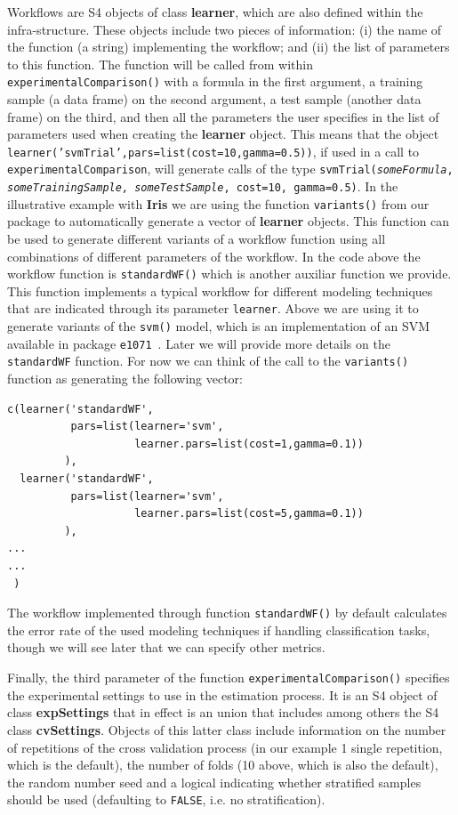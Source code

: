 \documentclass[10pt,a4paper]{article}
\begin{document}
Workflows are S4 objects of class \textbf{learner}, which are also
defined within the infra-structure. These objects include two pieces
of information: (i) the name of the function (a string) implementing the
workflow; and (ii) the list of parameters to this function. The
function will be called from within 
\texttt{experimentalComparison()}  with a formula in the first
argument, a training sample (a data frame) on the second argument, a
test sample (another data frame) on the third, and then all the parameters
the user specifies in the list of parameters used when creating the
\textbf{learner} object. This means that the object
\texttt{learner('svmTrial',pars=list(cost=10,gamma=0.5))}, if used in a
call to \texttt{experimentalComparison}, will 
 generate calls of the type
\texttt{svmTrial(\textit{someFormula}, \textit{someTrainingSample}, \textit{someTestSample}, cost=10,
  gamma=0.5)}. In the illustrative example with \textbf{Iris} we are using the function \texttt{variants()} from our package to automatically
generate a vector of \textbf{learner} objects. This function can be used
to generate different variants of a workflow function using all
combinations of different parameters of the workflow. In the code
above the workflow function is \texttt{standardWF()} which is another
auxiliar function we provide. This function implements a typical
workflow for different modeling techniques that are indicated through
its parameter \texttt{learner}. Above we are using it to generate
variants of the \texttt{svm()} model, which is an implementation of an SVM available in package \texttt{e1071}~\cite{}.  Later we will provide
more details on the \texttt{standardWF} function. For now we can think of the call
to the \texttt{variants()} function as generating the following vector:\linebreak
\begin{verbatim}
c(learner('standardWF',
          pars=list(learner='svm',
                    learner.pars=list(cost=1,gamma=0.1))
         ), 
  learner('standardWF',
          pars=list(learner='svm',
                    learner.pars=list(cost=5,gamma=0.1))
         ),
...
...
 ) 
\end{verbatim}
 
The workflow implemented through function \texttt{standardWF()} by
default calculates the error rate of the used modeling techniques if
handling classification tasks, though we will see later that we can
specify other metrics.

Finally, the third parameter of the function
\texttt{experimentalComparison()} specifies the experimental settings
to use in the estimation process. It is an S4 object of class
\textbf{expSettings} that in effect is an union that includes among
others the S4 class \textbf{cvSettings}. Objects of this latter class
include information on the number of repetitions of the cross
validation process (in our example 1 single repetition, which is the
default), the number of folds (10 above, which is also the default),
the random number seed and a logical indicating whether stratified
samples should be used (defaulting to \texttt{FALSE}, i.e. no stratification).
\end{document}
